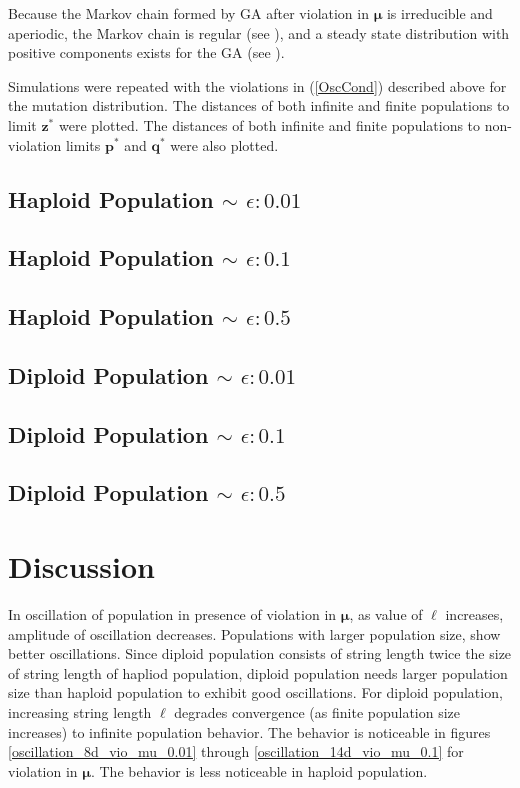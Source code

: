 Because the Markov chain formed by GA after violation in $\bm{\mu}$ is irreducible and aperiodic, 
the Markov chain is regular (see \cite{Iosifescu1980}), and a steady state distribution 
with positive components exists for the GA (see \cite{Minc1988}).   

Simulations were repeated with the violations in (\ref{OscCond}) described above for the mutation distribution.
The distances of both infinite and finite populations to limit $\bm{z}^\ast$ were plotted. 
The distances of both infinite and finite populations to non-violation limits $\bm{p}^\ast$ and $\bm{q}^\ast$ were also plotted.

\subsection{Haploid Population $\mathtt{\sim}$ $\epsilon: 0.01$}

\subsection{Haploid Population $\mathtt{\sim}$ $\epsilon: 0.1$}

\subsection{Haploid Population $\mathtt{\sim}$ $\epsilon: 0.5$}


\subsection{Diploid Population $\mathtt{\sim}$ $\epsilon: 0.01$}

\subsection{Diploid Population $\mathtt{\sim}$ $\epsilon: 0.1$}

\subsection{Diploid Population $\mathtt{\sim}$ $\epsilon: 0.5$}


\section{Discussion}
In oscillation of population in presence of violation in $\bm{\mu}$, 
as value of $\ell$ increases, amplitude of oscillation decreases. 
Populations with larger population size, show better oscillations. 
Since diploid population consists of string length twice the size of string length of hapliod population, 
diploid population needs larger population size than haploid population to exhibit good oscillations. 
For diploid population, increasing string length $\ell$ 
degrades convergence (as finite population size increases) to infinite population behavior. 
The behavior is noticeable in figures 
\ref{oscillation_8d_vio_mu_0.01} through \ref{oscillation_14d_vio_mu_0.1} for violation in $\bm{\mu}$. 
The behavior is less noticeable in haploid population. 

